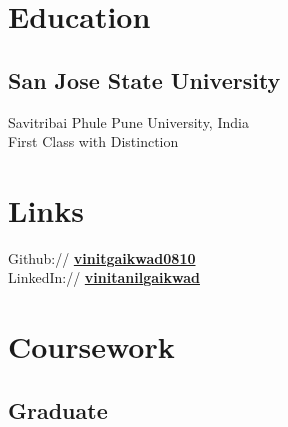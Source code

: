 \documentclass[letterpaper]{deedy-resume} %
\begin{document}
\begin{minipage}[t]{0.33\textwidth} %


\section{Education} 

\subsection{San Jose State University}


\sectionspace %

Savitribai Phule Pune University, India \\
First Class with Distinction \\
\sectionspace %



\section{Links} 

Github:// \href{https://github.com/vinitgaikwad0810}{\bf vinitgaikwad0810} \\
LinkedIn:// \href{https://www.linkedin.com/in/vinitanilgaikwad/}{\bf vinitanilgaikwad} \\

\sectionspace %


\section{Coursework}

\subsection{Graduate}


\end{minipage}
\end{document}
